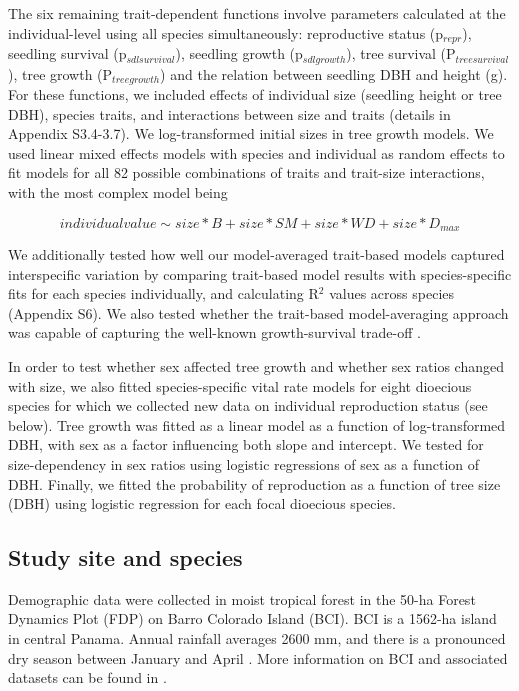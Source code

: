 \documentclass[b5paper,justified]{tufte-book} %
\begin{document}
\begin{fullwidth}
The six remaining trait-dependent functions involve parameters calculated at the individual-level using all species simultaneously: reproductive status (p$_{repr}$), seedling survival (p$_{sdl survival}$), seedling growth (p$_{sdl growth}$), tree survival (P$_{tree survival}$), tree growth (P$_{tree growth}$) and the relation between seedling DBH and height (g). For these functions, we included effects of individual size (seedling height or tree DBH), species traits, and interactions between size and traits (details in Appendix S3.4-3.7). We log-transformed initial sizes in tree growth models. We used linear mixed effects models with species and individual as random effects to fit models for all 82 possible combinations of traits and trait-size interactions, with the most complex model being 

\begin{equation}
individual value \sim size*B+size*SM+size*WD+size*D_{max}
\label{eq:chap6eq8}
\end{equation}

We additionally tested how well our model-averaged trait-based models captured interspecific variation by comparing trait-based model results with species-specific fits for each species individually, and calculating R$^2$ values across species (Appendix S6). We also tested whether the trait-based model-averaging approach was capable of capturing the well-known growth-survival trade-off \citep[][Appendix S7]{Wright2010}.

In order to test whether sex affected tree growth and whether sex ratios changed with size, we also fitted species-specific vital rate models for eight dioecious species for which we collected new data on individual reproduction status (see below). Tree growth was fitted as a linear model as a function of log-transformed DBH, with sex as a factor influencing both slope and intercept. We tested for size-dependency in sex ratios using logistic regressions of sex as a function of DBH. Finally, we fitted the probability of reproduction as a function of tree size (DBH) using logistic regression for each focal dioecious species.

\subsection{Study site and species}
Demographic data were collected in moist tropical forest in the 50-ha Forest Dynamics Plot (FDP) on Barro Colorado Island (BCI). BCI is a 1562-ha island in central Panama. Annual rainfall averages 2600 mm, and there is a pronounced dry season between January and April \citep{Leigh1999}. More information on BCI and associated datasets can be found in \citet{Croat1978, Condit1999, Leigh1999}. 


\end{fullwidth}
\end{document}
